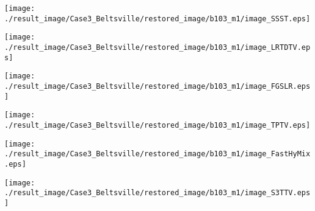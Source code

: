 \begin{figure*}[t]
\begin{center}
		\begin{minipage}{0.125\hsize}
			\centerline{\hspace{\hsize}} %
		\end{minipage}
		\begin{minipage}{0.125\hsize}
			\centerline{\texttt{[image: ./result\_image/Case3\_Beltsville/restored\_image/b103\_m1/image\_SSST.eps]}} %
		\end{minipage}
		\begin{minipage}{0.125\hsize}
			\centerline{\texttt{[image: ./result\_image/Case3\_Beltsville/restored\_image/b103\_m1/image\_LRTDTV.eps]}} %
		\end{minipage}
		\begin{minipage}{0.125\hsize}
			\centerline{\texttt{[image: ./result\_image/Case3\_Beltsville/restored\_image/b103\_m1/image\_FGSLR.eps]}} %
		\end{minipage}
		\begin{minipage}{0.125\hsize}
			\centerline{\texttt{[image: ./result\_image/Case3\_Beltsville/restored\_image/b103\_m1/image\_TPTV.eps]}} %
		\end{minipage}
		\begin{minipage}{0.125\hsize}
			\centerline{\texttt{[image: ./result\_image/Case3\_Beltsville/restored\_image/b103\_m1/image\_FastHyMix.eps]}} %
		\end{minipage}
		\begin{minipage}{0.125\hsize}
			\centerline{\texttt{[image: ./result\_image/Case3\_Beltsville/restored\_image/b103\_m1/image\_S3TTV.eps]}} %
		\end{minipage}
		\begin{minipage}{0.050\hsize}
			\centerline{\hspace{\hsize}} %
		\end{minipage}
		
		\vspace{1mm}
		

\end{center}
\end{figure*}
